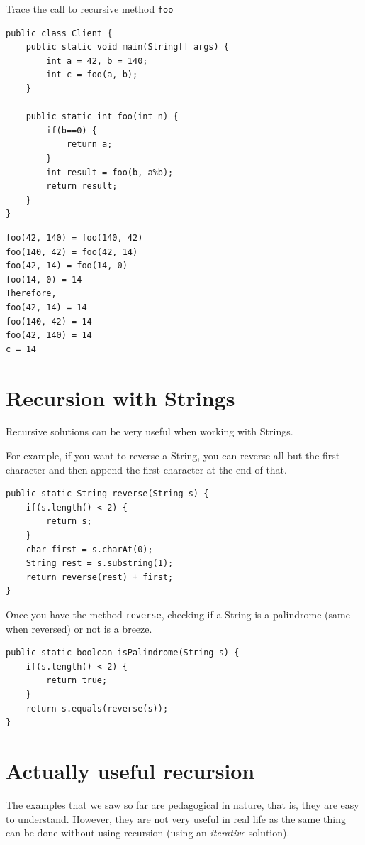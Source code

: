 \newpage

\begin{exercise}[6]
Trace the call to recursive method \texttt{foo}

\begin{lstlisting}
public class Client {
	public static void main(String[] args) {
		int a = 42, b = 140;
		int c = foo(a, b);
	}
	
	public static int foo(int n) {
		if(b==0) {
			return a;
		}
		int result = foo(b, a%b);
		return result;
	}
}
\end{lstlisting}
\end{exercise}
\begin{answer}
\begin{verbatim}
foo(42, 140) = foo(140, 42)
foo(140, 42) = foo(42, 14)
foo(42, 14) = foo(14, 0)
foo(14, 0) = 14
Therefore,
foo(42, 14) = 14
foo(140, 42) = 14
foo(42, 140) = 14
c = 14
\end{verbatim}
\end{answer}

\section{Recursion with Strings}

Recursive solutions can be very useful when working with Strings.

For example, if you want to reverse a String, you can reverse all but the first character and then append the first character at the end of that.

\begin{lstlisting}
public static String reverse(String s) {
	if(s.length() < 2) {
		return s;
	}
	char first = s.charAt(0);
	String rest = s.substring(1);
	return reverse(rest) + first;
}
\end{lstlisting}

Once you have the method \texttt{reverse}, checking if a String is a palindrome (same when reversed) or not is a breeze.

\begin{lstlisting}
public static boolean isPalindrome(String s) {
	if(s.length() < 2) {
		return true;
	}
	return s.equals(reverse(s));
}
\end{lstlisting}
\section{Actually useful recursion}

The examples that we saw so far are pedagogical in nature, that is, they are easy to understand. However, they are not very useful in real life as the same thing can be done without using recursion (using an \textit{iterative} solution).


